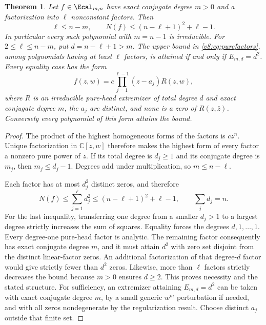 \documentclass[UTF8,11pt]{ctexart}
\newtheorem{thm}{Theorem}[section]
\theoremstyle{definition}
\numberwithin{equation}{section}
\newcommand{\C}{\mathbb C}\newcommand{\R}{\mathbb R}
\begin{document}
\begin{thm}\label{v8:thm:purefactors}
Let $f\in\Ecal_{m,n}$ have exact conjugate degree $m>0$ and
a factorization into $\ell$ nonconstant factors. Then
\begin{equation}\label{v8:eq:purefactors}
 \ell\le n-m,\qquad N(f)\le(n-\ell+1)^2+\ell-1.
\end{equation}
In particular every such polynomial with $m=n-1$ is irreducible.
For $2\le\ell\le n-m$, put $d=n-\ell+1>m$.
The upper bound in \eqref{v8:eq:purefactors}, among polynomials
having at least $\ell$ factors, is attained if and only if
$E_{m,d}=d^2$.
Every equality case has the form
\begin{equation}\label{v8:eq:purefactorequality}
 f(z,w)=c\prod_{j=1}^{\ell-1}(z-a_j)R(z,w),
\end{equation}
where $R$ is an irreducible pure-head extremizer of total degree
$d$ and exact conjugate degree $m$, the $a_j$ are distinct, and
none is a zero of $R(z,\bar z)$. Conversely every polynomial of
this form attains the bound.
\end{thm}
\begin{proof}
The product of the highest homogeneous forms of the factors is
$cz^n$. Unique factorization in $\C[z,w]$ therefore makes the
highest form of every factor a nonzero pure power of $z$.
If its total degree is $d_j\ge1$ and its conjugate degree is
$m_j$, then $m_j\le d_j-1$. Degrees add under multiplication,
so $m\le n-\ell$.

Each factor has at most $d_j^2$ distinct zeros, and therefore
\[
 N(f)\le\sum_{j=1}^{\ell}d_j^2
 \le(n-\ell+1)^2+\ell-1,
 \qquad \sum_jd_j=n.
\]
For the last inequality, transferring one degree from a smaller
$d_j>1$ to a largest degree strictly increases the sum of squares.
Equality forces the degrees $d,1,\ldots,1$. Every degree-one
pure-head factor is analytic. The remaining factor consequently
has exact conjugate degree $m$, and it must attain $d^2$ with
zero set disjoint from the distinct linear-factor zeros.
An additional factorization of that degree-$d$ factor would give
strictly fewer than $d^2$ zeros. Likewise, more than $\ell$ factors
strictly decreases the bound because $m>0$ ensures $d\ge2$.
This proves necessity and the stated structure. For sufficiency,
an extremizer attaining $E_{m,d}=d^2$ can be taken with exact
conjugate degree $m$, by a small generic $w^m$ perturbation if
needed, and with all zeros nondegenerate by the regularization
result. Choose distinct $a_j$ outside that finite set.
\end{proof}
\end{document}
